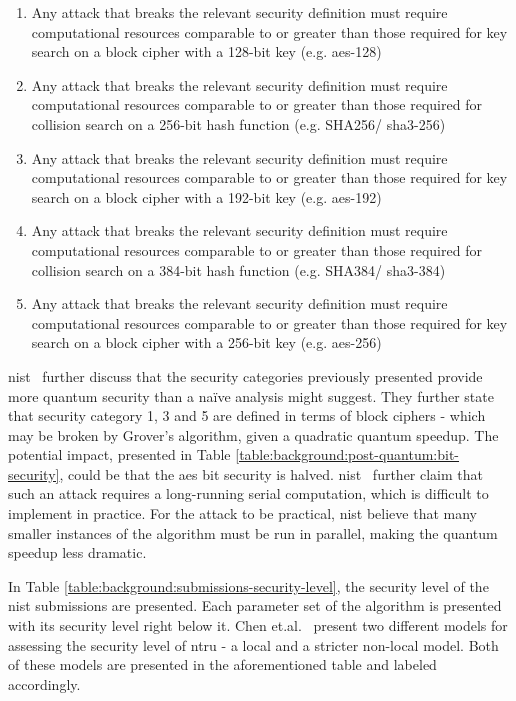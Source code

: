 \begin{enumerate}
    \item Any attack that breaks the relevant security definition must require computational resources comparable to or greater than those required for key search on a block cipher with a 128-bit key (e.g. \gls{aes}-128)
    \item Any attack that breaks the relevant security definition must require computational resources comparable to or greater than those required for collision search on a 256-bit hash function (e.g. SHA256/ \gls{sha3}-256)
    \item Any attack that breaks the relevant security definition must require computational resources comparable to or greater than those required for key search on a block cipher with a 192-bit key (e.g. \gls{aes}-192)
    \item Any attack that breaks the relevant security definition must require computational resources comparable to or greater than those required for collision search on a 384-bit hash function (e.g. SHA384/ \gls{sha3}-384)
    \item Any attack that breaks the relevant security definition must require computational resources comparable to or greater than those required for key search on a block cipher with a 256-bit key (e.g. \gls{aes}-256)
\end{enumerate}

\noindent \gls{nist}~\cite{nist2017} further discuss that the security categories previously presented provide more quantum security than a naïve analysis might suggest. They further state that security category 1, 3 and 5 are defined in terms of block ciphers - which may be broken by Grover's algorithm, given a quadratic quantum speedup. The potential impact, presented in Table \ref{table:background:post-quantum:bit-security}, could be that the \gls{aes} bit security is halved. \gls{nist}~\cite{nist2017} further claim that such an attack requires a long-running serial computation, which is difficult to implement in practice. For the attack to be practical, \gls{nist} believe that many smaller instances of the algorithm must be run in parallel, making the quantum speedup less dramatic.

In Table \ref{table:background:submissions-security-level}, the security level of the \gls{nist} submissions are presented. Each parameter set of the algorithm is presented with its security level right below it. Chen et.al.~\cite{ntru2020} present two different models for assessing the security level of \gls{ntru} - a local and a stricter non-local model. Both of these models are presented in the aforementioned table and labeled accordingly.

